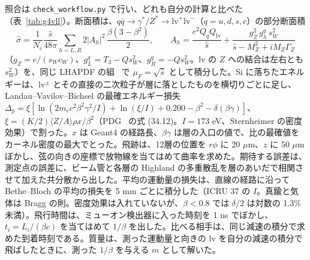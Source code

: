 \documentclass[a4paper,10pt]{ltjsarticle}
\begin{document}
照合は \texttt{check\_workflow.py} で行い、どれも自分の計算と比べた（表~\ref{tab:g4vll}）。断面積は、$q\bar q\to\gamma^*/Z^*\to\mathrm{lv}^+\mathrm{lv}^-$（$q=u,d,s,c$）の部分断面積
\[
\hat\sigma=\frac{1}{N_c}\frac{\hat s}{48\pi}\sum_{h=L,R}2|A_h|^2\,\frac{\beta(3-\beta^2)}{2},\qquad
A_h=\frac{e^2Q_qQ_{\mathrm{lv}}}{\hat s}+\frac{g_Z^2\,g_h^q\,s_W^2}{\hat s-M_Z^2+iM_Z\Gamma_Z}
\]
（$g_Z=e/(s_Wc_W)$、$g_L^q=T_3-Qs_W^2$、$g_R^q=-Qs_W^2$。lv の $Z$ への結合は左右とも $s_W^2$）を、同じ LHAPDF の組~\cite{lhapdf6} で $\mu_F=\sqrt{\hat s}$ として積分した。Si に落ちたエネルギーは、lv$^\pm$ とその直接の二次粒子が層に落としたものを横切りごとに足し、Landau--Vavilov--Bichsel の最確エネルギー損失 $\Delta_p=\xi[\ln(2m_ec^2\beta^2\gamma^2/I)+\ln(\xi/I)+0.200-\beta^2-\delta(\beta\gamma)]$、$\xi=(K/2)\langle Z/A\rangle\rho x/\beta^2$（PDG~\cite{pdg} の式 (34.12)。$I=173$ eV、Sternheimer の密度効果）で割った。$x$ は Geant4 の経路長、$\beta\gamma$ は層の入口の値で、比の最確値をカーネル密度の最大でとった。飛跡は、12層の位置を $r\phi$ に 20 $\mu$m、$z$ に 50 $\mu$m ぼかし、弦の向きの座標で放物線を当てはめて曲率を求めた。期待する誤差は、測定点の誤差に、ビーム管と各層の Highland の多重散乱を層のあいだで相関させて加えた共分散から出した。平均の運動量の損失は、直線の経路に沿って Bethe--Bloch の平均の損失を 5 mm ごとに積分した（ICRU 37 の $I$。真鍮と気体は Bragg の則。密度効果は入れていないが、$\beta<0.8$ では $\delta/2$ は対数の 1.3\% 未満）。飛行時間は、ミューオン検出器に入った時刻を 1 ns でぼかし、$t_i=L_i/(\beta c)$ を当てはめて $1/\beta$ を出した。比べる相手は、同じ減速の積分で求めた到着時刻である。質量は、測った運動量と向きの lv を自分の減速の積分で飛ばしたときに、測った $1/\beta$ を与える $m$ として解いた。
\end{document}
